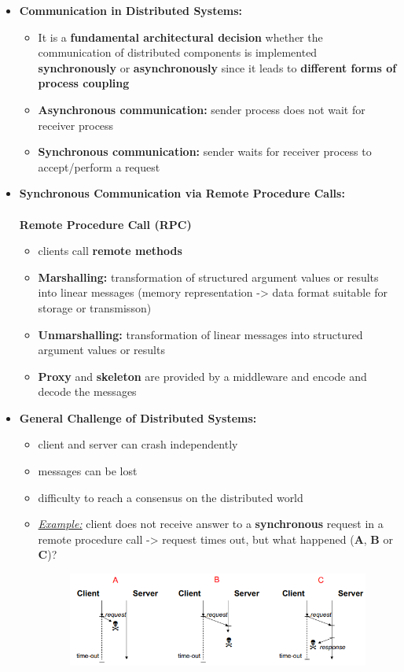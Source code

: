 \documentclass[ieeetran]{article}
\begin{document}
\begin{itemize}
  \item \textbf{Communication in Distributed Systems:}
	  \begin{itemize}
	    \item It is a \textbf{fundamental architectural decision} whether the communication of distributed components is implemented \textbf{synchronously} or \textbf{asynchronously} since it leads to \textbf{different forms of process coupling}
	\item \textbf{Asynchronous communication:} sender process does not wait for receiver process
	\item \textbf{Synchronous communication:} sender waits for receiver process to accept/perform a request
	  \end{itemize}

\item \textbf{Synchronous Communication via Remote Procedure Calls:}\\ \\
	\textbf{Remote Procedure Call (RPC)}
	\begin{itemize}
	  \item clients call \textbf{remote methods}
	\item \textbf{Marshalling:} transformation of structured argument values or results into linear messages (memory representation -> data format suitable for storage or transmisson)
	\item \textbf{Unmarshalling:} transformation of linear messages into structured argument values or results
		\item \textbf{Proxy} and \textbf{skeleton} are provided by a middleware and encode and decode the messages
	\end{itemize}

\item \textbf{General Challenge of Distributed Systems:}
	\begin{itemize}
	  \item client and server can crash independently
	\item messages can be lost
	\item difficulty to reach a consensus on the distributed world
	\item \textit{\underline{Example:}} client does not receive answer to a \textbf{synchronous} request in a remote procedure call -> request times out, but what happened (\textbf{A}, \textbf{B} or \textbf{C})?
		\begin{figure}[h!]
		  \centering
		  \includegraphics[width=0.8\linewidth]{challengedist.png}
		  \label{fig:challengedist_png}
		\end{figure}
	\end{itemize}


\end{itemize}
\end{document}
